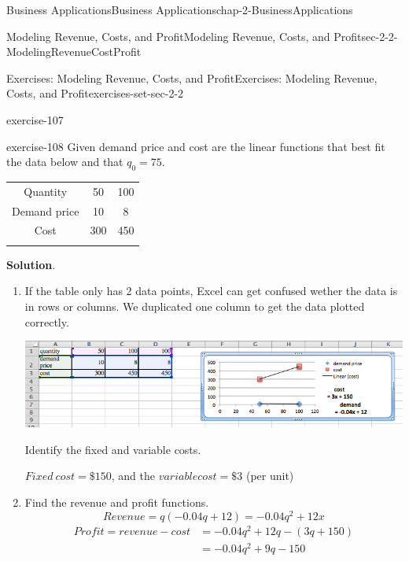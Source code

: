 \documentclass[oneside,10pt,]{book}
\numberwithin{equation}{section}
\newcommand{\hrulethin}  {\noalign{\hrule height 0.04em}}
\newcommand{\hrulemedium}{\noalign{\hrule height 0.07em}}
\newcommand{\hrulethick} {\noalign{\hrule height 0.11em}}
\newcommand{\amp}{&}
\begin{document}
\begin{chapterptx}{Business Applications}{}{Business Applications}{}{}{chap-2-BusinessApplications}
\begin{sectionptx}{Modeling Revenue, Costs, and Profit}{}{Modeling Revenue, Costs, and Profit}{}{}{sec-2-2-ModelingRevenueCostProfit}
\begin{exercises-subsection-numberless}{Exercises: Modeling Revenue, Costs, and Profit}{}{Exercises: Modeling Revenue, Costs, and Profit}{}{}{exercises-set-sec-2-2}
\begin{exercisegroup}
\begin{divisionexerciseeg}{4}{}{}{exercise-107}
\end{divisionexerciseeg}%
\begin{divisionexerciseeg}{5}{}{}{exercise-108}%
\hypertarget{p-714}{}%
Given demand price and cost are the linear functions that best fit the data below and that \(q_0=75\).%
\begin{sidebyside}{1}{0}{0}{0}%
\begin{sbspanel}{1}%
{\centering%
\begin{tabular}{ccc}\hrulethick
Quantity&50&100\tabularnewline\hrulethin
Demand price&10&8\tabularnewline\hrulemedium
Cost&300&450\tabularnewline\hrulemedium
\end{tabular}
\par}
\end{sbspanel}%
\end{sidebyside}%
\par\smallskip%
\noindent\textbf{Solution}.\hypertarget{solution-52}{}\quad%
\leavevmode%
\begin{enumerate}[label=(\alph*)]
\item\hypertarget{li-206}{}\hypertarget{p-715}{}%
If the table only has 2 data points, Excel can get confused wether the data is in rows or columns.  We duplicated one column to get the data plotted correctly. \leavevmode%
\begin{sidebyside}{1}{0}{0}{0}%
\begin{sbspanel}{1}%
\includegraphics[width=1\linewidth]{images/sec2-2-sol5a.png}
\end{sbspanel}%
\end{sidebyside}%
 Identify the fixed and variable costs.%
\par
\hypertarget{p-716}{}%
\(Fixed\ cost = \$150\), and the \(variable cost =\$3\) (per unit)%
\item\hypertarget{li-207}{}\hypertarget{p-717}{}%
Find the revenue and profit functions.%
%
\begin{equation*}
Revenue=q(-0.04q+12)= -0.04 q^2+12x
\end{equation*}
%
\begin{align*}
Profit=revenue-cost \amp=-0.04 q^2+12q-(3q+150)\\
\amp=-0.04 q^2+9q-150
\end{align*}

\end{enumerate}
\end{divisionexerciseeg}
\end{exercisegroup}
\end{exercises-subsection-numberless}
\end{sectionptx}
\end{chapterptx}
\end{document}
